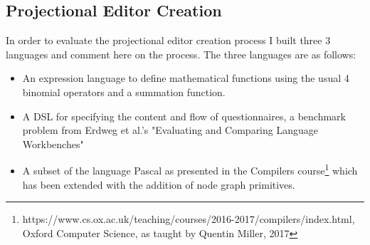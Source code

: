 \documentclass{article}
\begin{document}
\subsection{Projectional Editor Creation}\label{creationEvaluation}
In order to evaluate the projectional editor creation process I built three 3 languages and comment here on the process. The three languages are as follows:
\begin{itemize}
\item An expression language to define mathematical functions using the usual 4 binomial operators and a summation function.
\item A DSL for specifying the content and flow of questionnaires, a benchmark problem from Erdweg et al.'s "Evaluating and Comparing Language Workbenches"~\cite{languageWorkbenchChallenge}
\item A subset of the language Pascal as presented in the Compilers course\footnote{https://www.cs.ox.ac.uk/teaching/courses/2016-2017/compilers/index.html, Oxford Computer Science, as taught by Quentin Miller, 2017} which has been extended with the addition of node graph primitives. 
\end{itemize}
%
\end{document}
